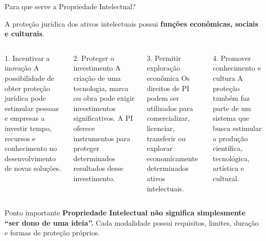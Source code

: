 \documentclass[9pt]{beamer}
\begin{document}
\begin{frame}{Para que serve a Propriedade Intelectual?}

  \begin{center}
    \normalsize
    A proteção jurídica dos ativos intelectuais possui
    \textbf{funções econômicas, sociais e culturais}.
  \end{center}

  \vspace{0.35cm}

  \begin{columns}[T]


    \begin{block}{1. Incentivar a inovação}
      \small
      A possibilidade de obter proteção jurídica pode
      estimular pessoas e empresas a investir tempo,
      recursos e conhecimento no desenvolvimento de
      novas soluções.
    \end{block}

    \vspace{0.2cm}

    \begin{block}{2. Proteger o investimento}
      \small
      A criação de uma tecnologia, marca ou obra pode
      exigir investimentos significativos. A PI oferece
      instrumentos para proteger determinados resultados
      desse investimento.
    \end{block}


    \begin{block}{3. Permitir exploração econômica}
      \small
      Os direitos de PI podem ser utilizados para
      comercializar, licenciar, transferir ou explorar
      economicamente determinados ativos intelectuais.
    \end{block}

    \vspace{0.2cm}

    \begin{block}{4. Promover conhecimento e cultura}
      \small
      A proteção também faz parte de um sistema que
      busca estimular a produção científica, tecnológica,
      artística e cultural.
    \end{block}

  \end{columns}

  \vspace{0.35cm}

  \begin{alertblock}{Ponto importante}
    \small
    \textbf{Propriedade Intelectual não significa simplesmente
    ``ser dono de uma ideia''.} Cada modalidade possui
    requisitos, limites, duração e formas de proteção próprios.
  \end{alertblock}

\end{frame}
\end{document}
